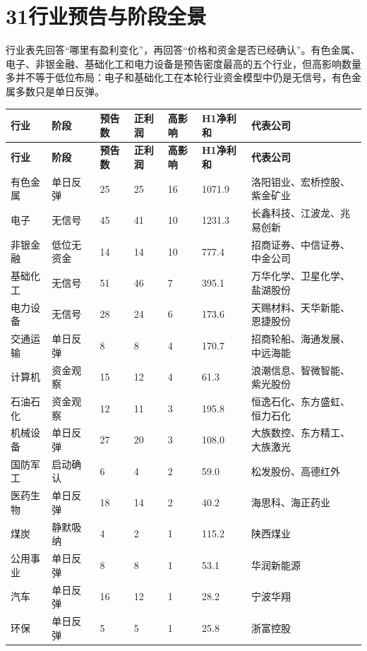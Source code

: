 \section{31行业预告与阶段全景}

行业表先回答“哪里有盈利变化”，再回答“价格和资金是否已经确认”。有色金属、电子、非银金融、基础化工和电力设备是预告密度最高的五个行业，但高影响数量多并不等于低位布局：电子和基础化工在本轮行业资金模型中仍是无信号，有色金属多数只是单日反弹。

\small
\begin{longtable}{L{1.8cm}L{1.55cm}R{1.05cm}R{1.05cm}R{1.05cm}R{1.25cm}L{4.1cm}}
\toprule
\textbf{行业} & \textbf{阶段} & \textbf{预告数} & \textbf{正利润} & \textbf{高影响} & \textbf{H1净利和} & \textbf{代表公司} \\
\midrule
\endfirsthead
\toprule
\textbf{行业} & \textbf{阶段} & \textbf{预告数} & \textbf{正利润} & \textbf{高影响} & \textbf{H1净利和} & \textbf{代表公司} \\
\midrule
\endhead
有色金属 & 单日反弹 & 25 & 25 & 16 & 1071.9 & 洛阳钼业、宏桥控股、紫金矿业 \\
电子 & 无信号 & 45 & 41 & 10 & 1231.3 & 长鑫科技、江波龙、兆易创新 \\
非银金融 & 低位无资金 & 14 & 14 & 10 & 777.4 & 招商证券、中信证券、中金公司 \\
基础化工 & 无信号 & 51 & 46 & 7 & 395.1 & 万华化学、卫星化学、盐湖股份 \\
电力设备 & 无信号 & 28 & 24 & 6 & 173.6 & 天赐材料、天华新能、恩捷股份 \\
交通运输 & 单日反弹 & 8 & 8 & 4 & 170.7 & 招商轮船、海通发展、中远海能 \\
计算机 & 资金观察 & 15 & 12 & 4 & 61.3 & 浪潮信息、智微智能、紫光股份 \\
石油石化 & 资金观察 & 12 & 11 & 3 & 195.8 & 恒逸石化、东方盛虹、恒力石化 \\
机械设备 & 单日反弹 & 27 & 20 & 3 & 108.0 & 大族数控、东方精工、大族激光 \\
国防军工 & 启动确认 & 6 & 4 & 2 & 59.0 & 松发股份、高德红外 \\
医药生物 & 单日反弹 & 18 & 14 & 2 & 40.2 & 海思科、海正药业 \\
煤炭 & 静默吸纳 & 4 & 2 & 1 & 115.2 & 陕西煤业 \\
公用事业 & 单日反弹 & 8 & 8 & 1 & 53.1 & 华润新能源 \\
汽车 & 单日反弹 & 16 & 12 & 1 & 28.2 & 宁波华翔 \\
环保 & 单日反弹 & 5 & 5 & 1 & 25.8 & 浙富控股 \\

\end{longtable}
